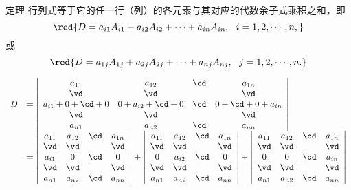 \begin{frame}
  \begin{footnotesize}
    \begin{block}{定理}
      行列式等于它的任一行（列）的各元素与其对应的代数余子式乘积之和，即
      $$
      \red{D = a_{i1} A_{i1} + a_{i2} A_{i2} + \cdots + a_{in} A_{in}, \ \  i = 1, 2, \cdots, n,}
      $$
      或
      $$
      \red{D = a_{1j} A_{1j} + a_{2j} A_{2j} + \cdots + a_{nj} A_{nj}, \ \ j = 1, 2, \cdots, n.}
      $$
    \end{block}
    \proofname
    $$ 
    \begin{array}{ll}
      D & = 
      \left|
      \begin{array}{cccc}
        a_{11}     &  a_{12} &  \cd & a_{1n} \\
        \vd           &  \vd    &      & \vd \\
        a_{i1}+0+\cd+0  & 0+ a_{i2}+ \cd + 0 &  \cd & 0 + \cd + 0 + a_{in} \\
        \vd           &  \vd    &      & \vd \\ 
        a_{n1}         &  a_{n2} & \cd & a_{nn} 
      \end{array}
      \right| \\[0.5cm]
      & = 
      \left|
      \begin{array}{cccc}
        a_{11}  &  a_{12} &  \cd & a_{1n} \\
        \vd     &  \vd    &      & \vd \\
        a_{i1}  &  0  &  \cd & 0  \\
        \vd     &  \vd    &      & \vd \\ 
        a_{n1}  &  a_{n2} & \cd & a_{nn} 
      \end{array}
      \right| + 
      \left|
      \begin{array}{ccccc}
        a_{11}   &  a_{12} &  \cd & a_{1n} \\
        \vd      &  \vd    &      & \vd \\
        0        &  a_{i2}  &  \cd & 0  \\
        \vd      &  \vd    &      & \vd \\ 
        a_{n1}   &   a_{n2} & \cd & a_{nn} 
      \end{array}
      \right|
      +
      \left|
      \begin{array}{cccc}
        a_{11}  &  a_{12} &  \cd & a_{1n} \\
        \vd     &  \vd    &      & \vd \\
        0       &  0  &  \cd & a_{in}  \\
        \vd     &  \vd    &      & \vd \\ 
        a_{n1}  &  a_{n2} & \cd & a_{nn} 
      \end{array}
      \right|
    \end{array}
    $$
  \end{footnotesize}
\end{frame}


